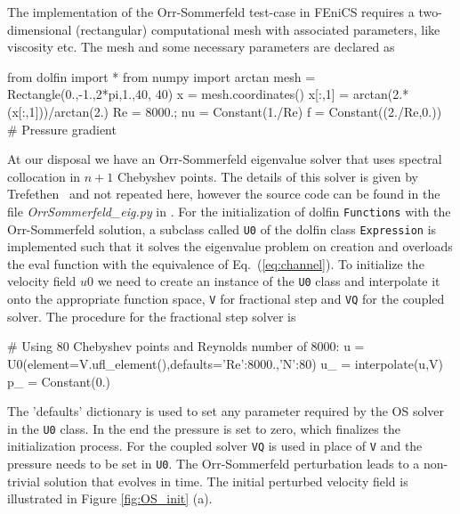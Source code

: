 The implementation of the Orr-Sommerfeld test-case in FEniCS requires a two-dimensional (rectangular) computational mesh with associated parameters, like viscosity etc. The  mesh and some necessary parameters are declared as
\begin{fenicscode}{0.9}
    from dolfin import *
    from numpy import arctan
    mesh = Rectangle(0.,-1.,2*pi,1.,40, 40)
    x = mesh.coordinates()
    x[:,1] = arctan(2.*(x[:,1]))/arctan(2.)
    Re = 8000.; nu = Constant(1./Re)
    f = Constant((2./Re,0.)) # Pressure gradient
\end{fenicscode}
At our disposal we have an Orr-Sommerfeld eigenvalue solver that uses spectral collocation in $n+1$ Chebyshev points. The details of this solver is given by Trefethen~\cite{tref06} and not repeated here, however the source code can be found in the file \emph{OrrSommerfeld\_eig.py} in \cite{folder}. For the initialization of dolfin {\fontsize{12pt}{12pt}\texttt{Functions}} with the Orr-Sommerfeld solution, a subclass called {\fontsize{12pt}{12pt}\texttt{U0}} of the dolfin class {\fontsize{12pt}{12pt}\texttt{Expression}} is implemented such that it solves the eigenvalue problem on creation and overloads the eval function with the equivalence of Eq.~(\ref{eq:channel}). To initialize the velocity field $u0$ we need to create an instance of the {\fontsize{12pt}{12pt}\texttt{U0}} class and interpolate it onto the appropriate function space, {\fontsize{12pt}{12pt}\texttt{V}} for fractional step and {\fontsize{12pt}{12pt}\texttt{VQ}} for the coupled solver. The procedure for the fractional step solver is
\begin{fenicscode}{0.9}
    # Using 80 Chebyshev points and Reynolds number of 8000:
    u = U0(element=V.ufl_element(),defaults={'Re':8000.,'N':80}) 
    u_ = interpolate(u,V)
    p_ = Constant(0.)
\end{fenicscode}
The 'defaults' dictionary is used to set any parameter required by the OS solver in the {\fontsize{12pt}{12pt}\texttt{U0}} class. In the end the pressure is set to zero, which finalizes the initialization process. For the coupled solver {\fontsize{12pt}{12pt}\texttt{VQ}} is used in place of {\fontsize{12pt}{12pt}\texttt{V}} and the pressure needs to be set in {\fontsize{12pt}{12pt}\texttt{U0}}. The Orr-Sommerfeld perturbation leads to a non-trivial solution that evolves in time. The initial perturbed velocity field is illustrated in Figure \ref{fig:OS_init} (a).
